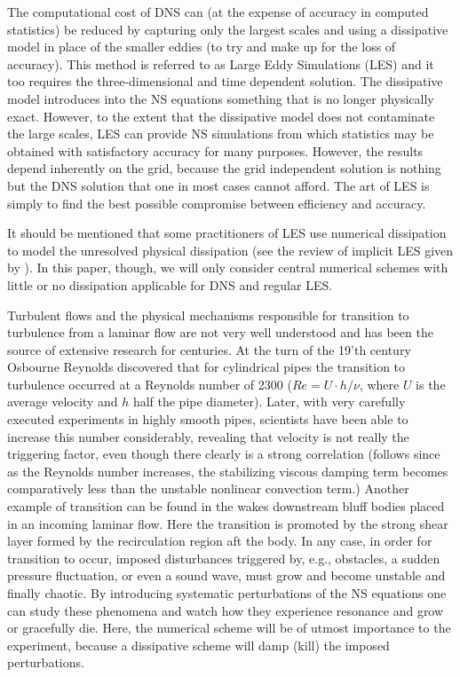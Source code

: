 The computational cost of DNS can (at the expense of accuracy in
computed statistics) be reduced by capturing only the largest scales
and using a dissipative model in place of the smaller eddies (to try
and make up for the loss of accuracy). This method is referred to as
Large Eddy Simulations (LES) and it too requires the three-dimensional
and time dependent solution. The dissipative model introduces into the
NS equations something that is no longer physically exact. However, to
the extent that the dissipative model does not contaminate the large
scales, LES can provide NS simulations from which statistics may be
obtained with satisfactory accuracy for many purposes. However, the
results depend inherently on the grid, because the grid independent
solution is nothing but the DNS solution that one in most cases cannot
afford. The art of LES is simply to find the best possible compromise
between efficiency and accuracy.

It should be mentioned that some practitioners of LES use numerical
dissipation to model the unresolved physical dissipation (see the 
review of implicit LES given by \citet{Iles}). In this paper, though,
we will only consider central numerical schemes with little or no
dissipation applicable for DNS and regular LES.


Turbulent flows and the physical mechanisms responsible for transition
to turbulence from a laminar flow are not very well understood and has
been the source of extensive research for centuries. At the turn of
the 19'th century Osbourne Reynolds discovered that for cylindrical
pipes the transition to turbulence occurred at a Reynolds number of
2300 ($Re=U\cdot h/\nu$, where $U$ is the average velocity and $h$
half the pipe diameter). Later, with very carefully executed
experiments in highly smooth pipes, scientists have been able to
increase this number considerably, revealing that velocity is not
really the triggering factor, even though there clearly is a strong
correlation (follows since as the Reynolds number increases, the
stabilizing viscous damping term becomes comparatively less than the
unstable nonlinear convection term.) Another example of transition can
be found in the wakes downstream bluff bodies placed in an incoming
laminar flow. Here the transition is promoted by the strong shear
layer formed by the recirculation region aft the body. In any case, in
order for transition to occur, imposed disturbances triggered by,
e.g., obstacles, a sudden pressure fluctuation, or even a sound wave,
must grow and become unstable and finally chaotic. By introducing
systematic perturbations of the NS equations one can study these
phenomena and watch how they experience resonance and grow or
gracefully die. Here, the numerical scheme will be of utmost
importance to the experiment, because a dissipative scheme will damp
(kill) the imposed perturbations.

